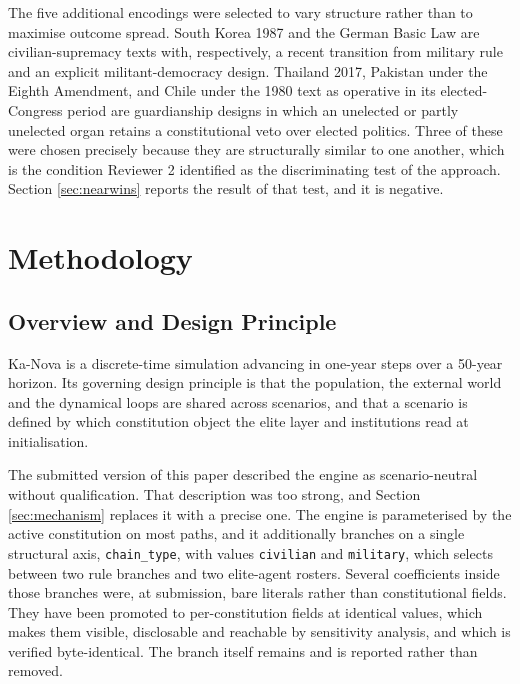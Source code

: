 \documentclass{ieeeaccess}
\begin{document}
The five additional encodings were selected to vary structure rather
than to maximise outcome spread. South Korea 1987 and the German Basic
Law are civilian-supremacy texts with, respectively, a recent transition
from military rule and an explicit militant-democracy design. Thailand
2017, Pakistan under the Eighth Amendment, and Chile under the 1980
text as operative in its elected-Congress period are guardianship
designs in which an unelected or partly unelected organ retains a
constitutional veto over elected politics. Three of these were chosen
precisely because they are structurally similar to one another, which is
the condition Reviewer 2 identified as the discriminating test of the
approach. Section \ref{sec:nearwins} reports the result of that test,
and it is negative.

\section{Methodology}
\label{sec:method}

\subsection{Overview and Design Principle}
Ka-Nova is a discrete-time simulation advancing in one-year steps over a
50-year horizon. Its governing design principle is that the population,
the external world and the dynamical loops are shared across scenarios,
and that a scenario is defined by which constitution object the elite
layer and institutions read at initialisation.

The submitted version of this paper described the engine as
scenario-neutral without qualification. That description was too strong,
and Section \ref{sec:mechanism} replaces it with a precise one. The
engine is parameterised by the active constitution on most paths, and it
additionally branches on a single structural axis, \texttt{chain\_type},
with values \texttt{civilian} and \texttt{military}, which selects
between two rule branches and two elite-agent rosters. Several
coefficients inside those branches were, at submission, bare literals
rather than constitutional fields. They have been promoted to
per-constitution fields at identical values, which makes them visible,
disclosable and reachable by sensitivity analysis, and which is verified
byte-identical. The branch itself remains and is reported rather than
removed.
\end{document}
